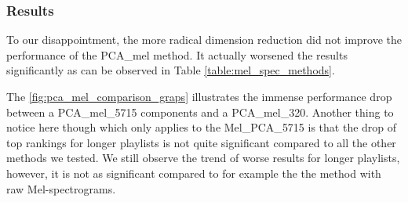 \subsubsection{Results}
To our disappointment, the more radical dimension reduction did not improve the performance of the PCA\_mel method. It actually worsened the results significantly as can be observed in Table \ref{table:mel_spec_methods}. 

The \ref{fig:pca_mel_comparison_graps} illustrates the immense performance drop between a PCA\_mel\_5715 components and a PCA\_mel\_320. Another thing to notice here though which only applies to the Mel\_PCA\_{5715} is that the drop of top rankings for longer playlists is not quite significant compared to all the other methods we tested. We still observe the trend of worse results for longer playlists, however, it is not as significant compared to for example the the method with raw Mel-spectrograms.
